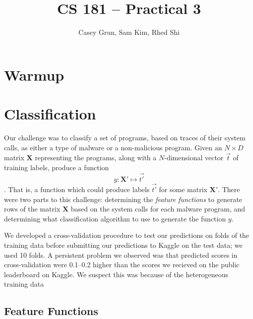 \documentclass[11pt]{amsart}
\title{CS 181 -- Practical 3}
\author{Casey Grun, Sam Kim, Rhed Shi}
\newcommand{\mat}[1]{\mathbf{#1}}
\begin{document}
\maketitle

\section{Warmup}


\section{Classification}

Our challenge was to classify a set of programs, based on traces of their system calls, as either a type of malware or a non-malicious program. Given an $N \times D$ matrix $\mat{X}$ representing the programs, along with a $N$-dimensional vector $\vec{t}$ of training labels, produce a function 
$$y : \mat{X'} \mapsto \vec{t'}$$.
That is, a function which could produce labels $\vec{t'}$ for some matrix $\mat{X'}$. There were two parts to this challenge: determining the \emph{feature functions} to generate rows of the matrix $\mat{X}$ based on the system calls for each malware program, and determining what classification algorithm to use to generate the function $y$.

We developed a cross-validation procedure to test our predictions on folds of the training data before submitting our predictions to Kaggle on the test data; we used 10 folds. A persistent problem we observed was that predicted scores in cross-validation were 0.1--0.2 higher than the scores we recieved on the public leaderboard on Kaggle. We suspect this was because of the heterogeneous training data 

\subsection{Feature Functions}
\end{document}

